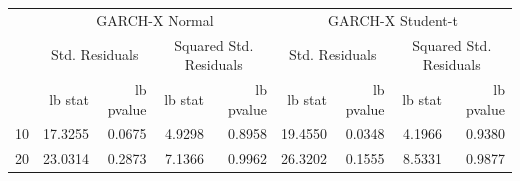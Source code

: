 \begin{table}[htbp]
\centering
\begin{tabular}{lrrrrrrrr}
\toprule
 & \multicolumn{4}{c}{GARCH-X Normal} & \multicolumn{4}{c}{GARCH-X Student-t} \\
 & \multicolumn{2}{c}{Std. Residuals} & \multicolumn{2}{c}{Squared Std. Residuals} & \multicolumn{2}{c}{Std. Residuals} & \multicolumn{2}{c}{Squared Std. Residuals} \\
 & lb stat & lb pvalue & lb stat & lb pvalue & lb stat & lb pvalue & lb stat & lb pvalue \\
\midrule
10 & 17.3255 & 0.0675 & 4.9298 & 0.8958 & 19.4550 & 0.0348 & 4.1966 & 0.9380 \\
20 & 23.0314 & 0.2873 & 7.1366 & 0.9962 & 26.3202 & 0.1555 & 8.5331 & 0.9877 \\
\bottomrule
\end{tabular}
\label{tab:residual_diagnostics}
\end{table}
